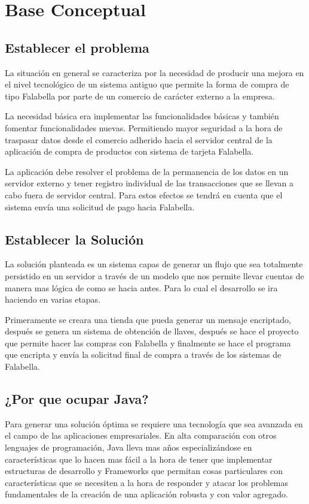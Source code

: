 \documentclass[a4paper,12pt,openany,oneside]{book}
\begin{document}
\section{Base Conceptual}
\subsection{Establecer el problema}
La situación en general se caracteriza por la necesidad de producir una mejora en el nivel tecnológico de un sistema antiguo que permite la forma de compra de tipo Falabella por parte de un comercio de carácter externo a la empresa. 

La necesidad básica era implementar las funcionalidades básicas y también fomentar funcionalidades nuevas. Permitiendo mayor seguridad a la hora de traspasar datos desde el comercio adherido hacia el servidor central de la aplicación de compra de productos con sistema de tarjeta Falabella.

La aplicación debe resolver el problema de la permanencia de los datos en un servidor externo y tener registro individual de las transacciones que se llevan a cabo fuera de servidor central. Para estos efectos  se tendrá en cuenta que el sistema envía una solicitud de pago hacia Falabella.
\subsection{Establecer la Solución}
La solución planteada es un sistema capas de generar un flujo que sea totalmente persistido en un servidor a través de un modelo que nos permite llevar cuentas de manera mas lógica de como se hacia antes. Para lo cual el desarrollo se ira haciendo en varias etapas.

Primeramente se creara una tienda que pueda generar un mensaje encriptado, después se genera un sistema de obtención de llaves, después se hace el proyecto que permite hacer las compras con Falabella y finalmente se hace el programa que encripta y envía la solicitud final de compra a través de los sistemas de Falabella.
\subsection{¿Por que ocupar Java?}
Para generar una solución óptima se requiere una tecnología que sea avanzada en el campo de las aplicaciones empresariales. En alta comparación con otros lenguajes de programación, Java lleva mas años especializándose en características que lo hacen mas fácil a la hora de tener que implementar estructuras de desarrollo y Frameworks que permitan cosas particulares con características que se necesiten a la hora de responder y atacar los problemas fundamentales de la creación de una aplicación robusta y con valor agregado.
\end{document}
